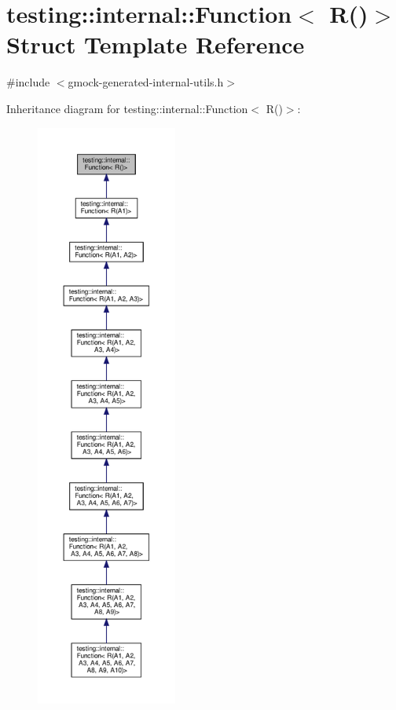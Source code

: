 \hypertarget{structtesting_1_1internal_1_1_function_3_01_r_07_08_4}{}\section{testing\+:\+:internal\+:\+:Function$<$ R()$>$ Struct Template Reference}
\label{structtesting_1_1internal_1_1_function_3_01_r_07_08_4}


{\ttfamily \#include $<$gmock-\/generated-\/internal-\/utils.\+h$>$}



Inheritance diagram for testing\+:\+:internal\+:\+:Function$<$ R()$>$\+:
\nopagebreak
\begin{figure}[H]
\begin{center}
\leavevmode
\includegraphics[height=550pt]{structtesting_1_1internal_1_1_function_3_01_r_07_08_4__inherit__graph}
\end{center}
\end{figure}
